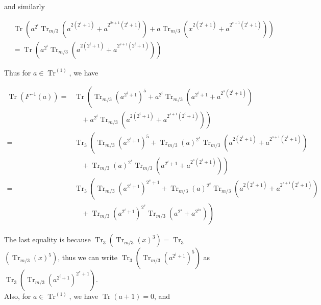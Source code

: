 \documentclass[10pt]{article}
\begin{document}
and similarly

$$
\begin{aligned}
& \operatorname{Tr}\left(a^{2^{i}} \operatorname{Tr}_{m / 3}\left(a^{2\left(2^{i}+1\right)}+a^{2^{2 s+1}\left(2^{i}+1\right)}\right)+a \operatorname{Tr}_{m / 3}\left(x^{2\left(2^{i}+1\right)}+a^{2^{s+1}\left(2^{i}+1\right)}\right)\right) \\
& =\operatorname{Tr}\left(a^{2^{i}} \operatorname{Tr}_{m / 3}\left(a^{2\left(2^{i}+1\right)}+a^{2^{s+1}\left(2^{i}+1\right)}\right)\right)
\end{aligned}
$$

Thus for $a \in \operatorname{Tr}^{(1)}$, we have

$$
\begin{aligned}
\operatorname{Tr}\left(F^{-1}(a)\right)= & \operatorname{Tr}\left(\operatorname{Tr}_{m / 3}\left(a^{2^{i}+1}\right)^{5}+a^{2^{i}} \operatorname{Tr}_{m / 3}\left(a^{2^{i}+1}+a^{2^{s}\left(2^{i}+1\right)}\right)\right. \\
& \left.\quad+a^{2^{i}} \operatorname{Tr}_{m / 3}\left(a^{2\left(2^{i}+1\right)}+a^{2^{s+1}\left(2^{i}+1\right)}\right)\right) \\
= & \operatorname{Tr}_{3}\left(\operatorname{Tr}_{m / 3}\left(a^{2^{i}+1}\right)^{5}+\operatorname{Tr}_{m / 3}(a)^{2^{s}} \operatorname{Tr}_{m / 3}\left(a^{2\left(2^{i}+1\right)}+a^{2^{s+1}\left(2^{i}+1\right)}\right)\right. \\
& \left.\quad+\operatorname{Tr}_{m / 3}(a)^{2^{s}} \operatorname{Tr}_{m / 3}\left(a^{2^{i}+1}+a^{2^{s}\left(2^{i}+1\right)}\right)\right) \\
= & \operatorname{Tr}_{3}\left(\operatorname{Tr}_{m / 3}\left(a^{2^{i}+1}\right)^{2^{s}+1}+\operatorname{Tr}_{m / 3}(a)^{2^{s}} \operatorname{Tr}_{m / 3}\left(a^{2\left(2^{i}+1\right)}+a^{2^{s+1}\left(2^{i}+1\right)}\right)\right. \\
& \left.\quad+\operatorname{Tr}_{m / 3}\left(a^{2^{i}+1}\right)^{2^{s}} \operatorname{Tr}_{m / 3}\left(a^{2^{s}}+a^{2^{2 s}}\right)\right)
\end{aligned}
$$

The last equality is because $\operatorname{Tr}_{3}\left(\operatorname{Tr}_{m / 3}(x)^{3}\right)=\operatorname{Tr}_{3}$\\
$\left(\operatorname{Tr}_{m / 3}(x)^{5}\right)$, thus we can write $\operatorname{Tr}_{3}\left(\operatorname{Tr}_{m / 3}\left(a^{2^{i}+1}\right)^{5}\right)$ as $\operatorname{Tr}_{3}\left(\operatorname{Tr}_{m / 3}\left(a^{2^{i}+1}\right)^{2^{s}+1}\right)$.\\
Also, for $a \in \operatorname{Tr}^{(1)}$, we have $\operatorname{Tr}(a+1)=0$, and
\end{document}
